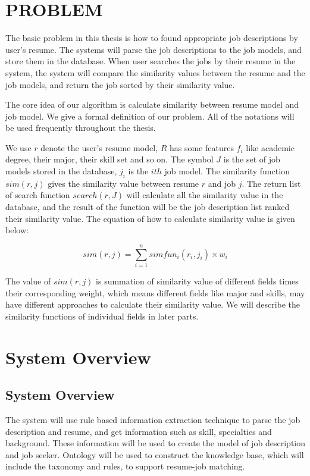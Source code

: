 \chapter{PROBLEM}

The basic problem in this thesis is how to found appropriate job descriptions by user's resume. The systems will parse the job descriptions to the job models, and store them in the database. When user searches the jobs by their resume in the system, the system will compare the similarity values between the resume and the job models, and return the job sorted by their similarity value.

The core idea of our algorithm is calculate similarity between resume model and job model.
We give a formal definition of our problem. All of the notations will be used frequently throughout the thesis.

We use $r$ denote the user's resume model, $R$ has some features $f_i$ like academic degree, their major, their skill set and so on. The symbol $J$ is the set of job models stored in the database, $j_i$ is the $ith$ job model. The similarity function $sim(r, j)$ gives the similarity value between resume $r$ and job $j$. The return list of search function $search(r,J)$ will calculate all the similarity value in the database, and the result of the function will be the job description list ranked their similarity value. The equation of how to calculate similarity value is given below:

$$ sim(r, j) = \sum_{i=1}^{n} simfun_i(r_i,j_i) \times w_i $$

The value of $sim(r, j)$ is summation of similarity value of different fields times their corresponding weight, which means different fields like major and skills,  may have different approaches to calculate their similarity value. We will describe the similarity functions of individual fields in later parts.



\chapter{System Overview}

\section{System Overview}
The system will use rule based information extraction technique to parse the job description and resume, and get information such as skill, specialties and background. These information will be used to create the model of job description and job seeker.  Ontology will be used to construct the knowledge base, which will include the taxonomy and rules, to support resume-job matching.

